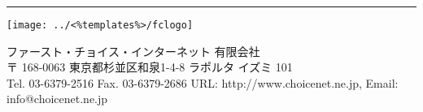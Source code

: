 \rule{\textwidth}{0.5pt}

\parbox[t]{.10\textwidth}{
\vspace{-0.1cm}
   \texttt{[image: ../<\%templates\%>/fclogo]}
}
\parbox[t]{.80\textwidth}{
\vspace{0.2cm}
        {\Large ファースト・チョイス・インターネット 有限会社 \\
         \small
        〒 168-0063 東京都杉並区和泉1-4-8 ラポルタ イズミ 101 \\
        Tel. 03-6379-2516 Fax. 03-6379-2686 URL: http://www.choicenet.ne.jp, Email: info@choicenet.ne.jp
      }
}